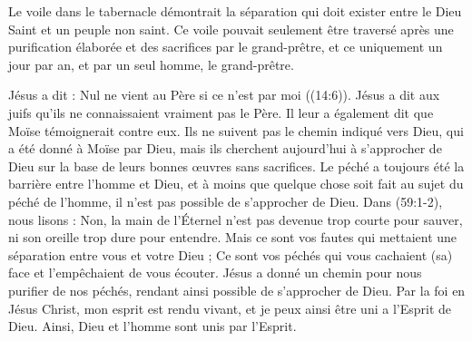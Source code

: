 Le voile dans le tabernacle démontrait la séparation qui doit exister entre le Dieu Saint et un peuple non saint. Ce voile pouvait seulement être traversé après une purification élaborée et des sacrifices par le grand-prêtre, et ce uniquement un jour par an, et par un seul homme, le grand-prêtre.

Jésus a dit : \og Nul ne vient au Père si ce n'est par moi \fg{} ((14:6)). Jésus a dit aux juifs qu'ils ne connaissaient vraiment pas le Père. Il leur a également dit que Moïse témoignerait contre eux. Ils ne suivent pas le chemin indiqué vers Dieu, qui a été donné à Moïse par Dieu, mais ils cherchent aujourd'hui à s'approcher de Dieu sur la base de leurs bonnes œuvres sans sacrifices. Le péché a toujours été la barrière entre l'homme et Dieu, et à moins que quelque chose soit fait au sujet du péché de l'homme, il n'est pas possible de s'approcher de Dieu. Dans (59:1-2), nous lisons : \og Non, la main de l'Éternel n'est pas devenue trop courte pour sauver, ni son oreille trop dure pour entendre. Mais ce sont vos fautes qui mettaient une séparation entre vous et votre Dieu ; Ce sont vos péchés qui vous cachaient (sa) face et l'empêchaient de vous écouter. \fg{} Jésus a donné un chemin pour nous purifier de nos péchés, rendant ainsi possible de s'approcher de Dieu. Par la foi en Jésus Christ, mon esprit est rendu vivant, et je peux ainsi être uni a l'Esprit de Dieu. Ainsi, Dieu et l'homme sont unis par l'Esprit.

